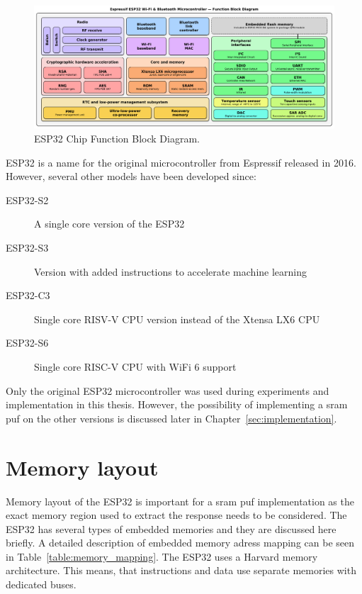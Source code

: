 \begin{figure}[ht!]
    \centering
    \captionsetup{justification=centering,margin=0.5cm}
    \includegraphics[width=\textwidth]{images/esp32_diagram.pdf}
    \caption[ESP32 Chip Function Block Diagram.]{ESP32 Chip Function Block Diagram.\cite{Krent2018}}
    \label{fig:esp32_diagram}
\end{figure}

ESP32 is a name for the original microcontroller from Espressif released in 2016. However, several other models have been developed since\cite{espidf2022}:

\begin{description}
    \item[ESP32-S2] A single core version of the ESP32
    \item[ESP32-S3] Version with added instructions to accelerate machine learning
    \item[ESP32-C3] Single core RISV-V CPU version instead of the Xtensa LX6 CPU
    \item[ESP32-S6] Single core RISC-V CPU with WiFi 6 support
\end{description}

Only the original ESP32 microcontroller was used during experiments and implementation in this thesis. However, the possibility of implementing a \gls{sram} \gls{puf} on the other versions is discussed later in Chapter~\ref{sec:implementation}.

\section{Memory layout}

Memory layout of the ESP32 is important for a \gls{sram} \gls{puf} implementation as the exact memory region used to extract the response needs to be considered. The ESP32 has several types of embedded memories and they are discussed here briefly. A detailed description of embedded memory adress mapping can be seen in Table~\ref{table:memory_mapping}. The ESP32 uses a Harvard memory architecture. This means, that instructions and data use separate memories with dedicated buses.\cite{esp322021}

